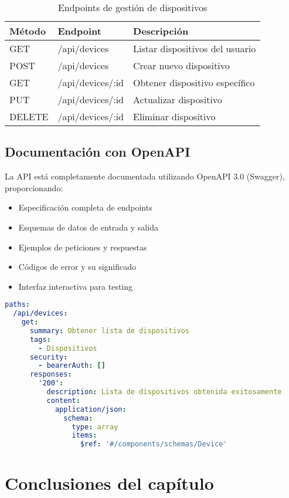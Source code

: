\begin{table}[H]
\centering
\begin{tabular}{|l|l|l|}
\hline
\textbf{Método} & \textbf{Endpoint} & \textbf{Descripción} \\
\hline
GET & /api/devices & Listar dispositivos del usuario \\
POST & /api/devices & Crear nuevo dispositivo \\
GET & /api/devices/:id & Obtener dispositivo específico \\
PUT & /api/devices/:id & Actualizar dispositivo \\
DELETE & /api/devices/:id & Eliminar dispositivo \\
\hline
\end{tabular}
\caption{Endpoints de gestión de dispositivos}
\label{tab:endpoints_devices}
\end{table}

\subsection{Documentación con OpenAPI}

La API está completamente documentada utilizando OpenAPI 3.0 (Swagger), proporcionando:

\begin{itemize}
    \item Especificación completa de endpoints
    \item Esquemas de datos de entrada y salida
    \item Ejemplos de peticiones y respuestas
    \item Códigos de error y su significado
    \item Interfaz interactiva para testing
\end{itemize}

\begin{lstlisting}[language=YAML, caption=Ejemplo de documentación OpenAPI]
paths:
  /api/devices:
    get:
      summary: Obtener lista de dispositivos
      tags:
        - Dispositivos
      security:
        - bearerAuth: []
      responses:
        '200':
          description: Lista de dispositivos obtenida exitosamente
          content:
            application/json:
              schema:
                type: array
                items:
                  $ref: '#/components/schemas/Device'
\end{lstlisting}

\section{Conclusiones del capítulo}

